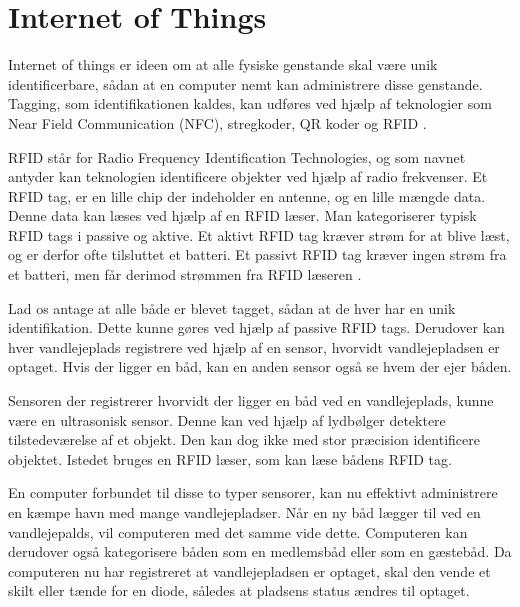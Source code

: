 \section{Internet of Things} %
\label{sec:internet_of_things}

Internet of things er ideen om at alle fysiske genstande skal være unik identificerbare, sådan at en computer nemt kan administrere disse genstande. Tagging, som identifikationen kaldes, kan udføres ved hjælp af teknologier som Near Field Communication (NFC), stregkoder, QR koder og RFID \cite{iot2013}.

RFID står for Radio Frequency Identification Technologies, og som navnet antyder kan teknologien identificere objekter ved hjælp af radio frekvenser. Et RFID tag, er en lille chip der indeholder en antenne, og en lille mængde data. Denne data kan læses ved hjælp af en RFID læser. Man kategoriserer typisk RFID tags i passive og aktive. Et aktivt RFID tag kræver strøm for at blive læst, og er derfor ofte tilsluttet et batteri. Et passivt RFID tag kræver ingen strøm fra et batteri, men får derimod strømmen fra RFID læseren \cite{want2006rfid}.

Lad os antage at alle både er blevet tagget, sådan at de hver har en unik identifikation. Dette kunne gøres ved hjælp af passive RFID tags. Derudover kan hver vandlejeplads registrere ved hjælp af en sensor, hvorvidt vandlejepladsen er optaget. Hvis der ligger en båd, kan en anden sensor også se hvem der ejer båden.

Sensoren der registrerer hvorvidt der ligger en båd ved en vandlejeplads, kunne være en ultrasonisk sensor. Denne kan ved hjælp af lydbølger detektere tilstedeværelse af et objekt. Den kan dog ikke med stor præcision identificere objektet. Istedet bruges en RFID læser, som kan læse bådens RFID tag.

En computer forbundet til disse to typer sensorer, kan nu effektivt administrere en kæmpe havn med mange vandlejepladser. Når en ny båd lægger til ved en vandlejepalds, vil computeren med det samme vide dette. Computeren kan derudover også kategorisere båden som en medlemsbåd eller som en gæstebåd. Da computeren nu har registreret at vandlejepladsen er optaget, skal den vende et skilt eller tænde for en diode, således at pladsens status ændres til optaget.

